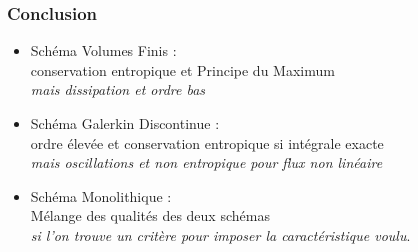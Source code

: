 
\begin{frame}
\frametitle{Conclusion}
\begin{itemize}
    \item Schéma Volumes Finis : \\
    conservation entropique et Principe du Maximum \\\emph{mais dissipation et ordre bas}\\
    \vspace{5mm}\item Schéma Galerkin Discontinue : \\
    ordre élevée et conservation entropique si intégrale exacte \\\emph{mais oscillations et non entropique pour flux non linéaire} \\
    \vspace{5mm}\item Schéma Monolithique : \\
    Mélange des qualités des deux schémas\\ \emph{si l'on trouve un critère pour imposer la caractéristique voulu}.
\end{itemize}


\end{frame}

